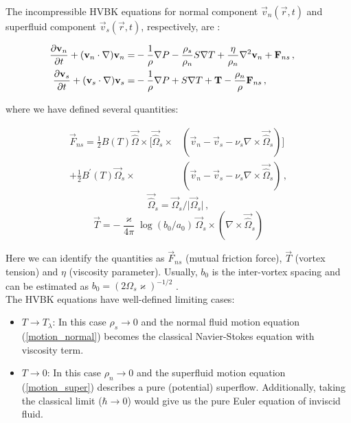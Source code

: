 The incompressible HVBK equations for normal component $\vec{v}_n (\vec{r}, t)$ and superfluid component $\vec{v}_s (\vec{r}, t)$, respectively, are \cite{barenghi}:

\begin{align}
\frac{\partial\vec{v}_n}{\partial t} + (\vec{v}_n\cdot \nabla)\vec{v}_n =& -\frac{1}{\rho} \nabla P - \frac{\rho_s}{\rho_n} S \nabla T + \frac{\eta}{\rho_n} \nabla^2 \vec{v}_n + \vec{F}_{ns}\,,
\label{motion_normal}\\
\frac{\partial\vec{v}_s}{\partial t} + (\vec{v}_s\cdot \nabla)\vec{v}_s =& -\frac{1}{\rho} \nabla P + S \nabla T + \vec{T} - \frac{\rho_n}{\rho} \vec{F}_{ns}\,,
\hspace{15mm}
\label{motion_super}
\end{align}

where we have defined several quantities:

\begin{align}
\vec{F}_{ns} =
\frac{1}{2} B(T) \vec{\hat{\Omega}} \times [\vec{\hat{\Omega}}_s \times &(\vec{v}_n - \vec{v}_s - \nu_s\nabla \times \vec{\hat{\Omega}}_s)]
\\
+ \frac{1}{2} B^{\prime}(T) \vec{\Omega}_s \times &(\vec{v}_n - \vec{v}_s - \nu_s\nabla \times \vec{\hat{\Omega}}_s)\,,
\end{align}
\begin{equation}
\vec{\hat{\Omega}}_s = \vec{\Omega}_s / \vert \vec{\Omega}_s \vert\,,
\end{equation}
\begin{equation}
\vec{T} = - \frac{\varkappa}{4\pi} \log(b_0 / a_0) \, \vec{\Omega}_s \times (\nabla \times \vec{\hat{\Omega}}_s)
\end{equation}

Here we can identify the quantities as $\vec{F}_{ns}$ (mutual friction force), $\vec{T}$ (vortex tension) and $\eta$ (viscosity parameter). Usually, $b_0$ is the inter-vortex spacing and can be estimated as $b_0 = (2\Omega_s \varkappa)^{-1/2}$ \cite{barenghi}.\\
The HVBK equations have well-defined limiting cases:

\begin{itemize}
	\item $T \rightarrow T_{\lambda}$: In this case $\rho_s \rightarrow 0$ and the normal fluid motion equation (\ref{motion_normal}) becomes the classical Navier-Stokes equation with viscosity term.

	\item $T \rightarrow 0$: In this case $\rho_n \rightarrow 0$ and the superfluid motion equation (\ref{motion_super}) describes a pure (potential) superflow. Additionally, taking the classical limit ($\hbar \rightarrow 0$) would give us the pure Euler equation of inviscid fluid.
\end{itemize}

